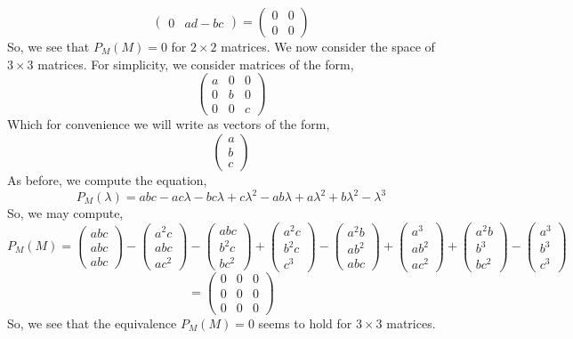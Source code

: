 \documentclass[letterpaper,10pt]{article}
\begin{document}
\begin{description}
\[\begin{pmatrix}
0 & ad-bc
\end{pmatrix}=\begin{pmatrix}
0 & 0\\
0 & 0
\end{pmatrix} \]
So, we see that $P_M(M)=0$ for $2\times 2$ matrices. We now consider the space of $3\times 3$ matrices. For simplicity, we consider matrices of the form,
\[\begin{pmatrix}
a & 0 & 0\\
0 & b & 0\\
0 & 0 & c
\end{pmatrix}\] Which for convenience we will write as vectors of the form,
\[\begin{pmatrix}
a\\b\\c
\end{pmatrix}\]
As before, we compute the equation,
\[P_M(\lambda)=abc-ac\lambda-bc\lambda+c\lambda^2-ab\lambda+a\lambda^2+b\lambda^2-\lambda^3\]
So, we may compute,
\[P_M(M)=\begin{pmatrix}
abc\\abc\\abc
\end{pmatrix}-\begin{pmatrix}
a^2c\\abc\\ac^2
\end{pmatrix}-\begin{pmatrix}
abc\\b^2c\\bc^2
\end{pmatrix}+\begin{pmatrix}
a^2c\\b^2c\\c^3
\end{pmatrix}-\begin{pmatrix}
a^2b\\ab^2\\abc
\end{pmatrix}+\begin{pmatrix}
a^3\\ab^2\\ac^2
\end{pmatrix}+\begin{pmatrix}
a^2b\\b^3\\bc^2
\end{pmatrix}-\begin{pmatrix}
a^3\\b^3\\c^3
\end{pmatrix} \]
\[=\begin{pmatrix}
0 & 0 & 0\\
0 & 0 & 0\\
0 & 0 & 0
\end{pmatrix}\]
So, we see that the equivalence $P_M(M)=0$ seems to hold for $3\times 3$ matrices.
\end{description}
\end{document}
